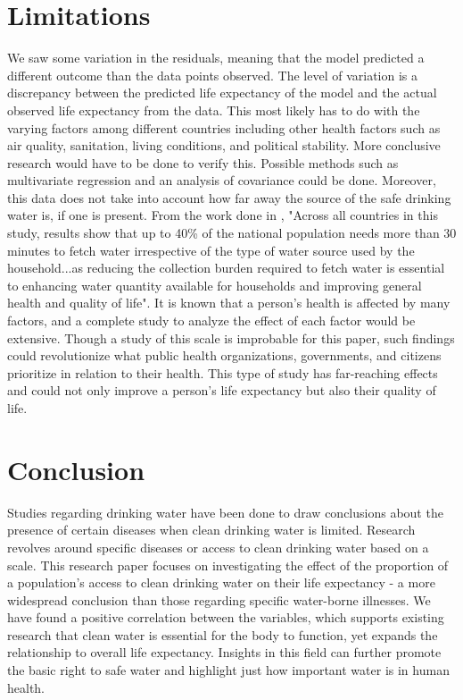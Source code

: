 \documentclass[12pt]{article}
\begin{document}
\section{Limitations}

We saw some variation in the residuals, meaning that the model predicted a different outcome than the data points observed. The level of variation is a discrepancy between the predicted life expectancy of the model and the actual observed life expectancy from the data. This most likely has to do with the varying factors among different countries including other health factors such as air quality, sanitation, living conditions, and political stability. More conclusive research would have to be done to verify this. Possible methods such as multivariate regression and an analysis of covariance could be done. Moreover, this data does not take into account how far away the source of the safe drinking water is, if one is present. From the work done in \citet{2018waterandhealth}, "Across all countries in this study, results show that up to 40\% of the national population needs more than 30 minutes to fetch water irrespective of the type of water source used by the household...as reducing the collection burden required to fetch water is essential to enhancing water quantity available for households and improving general health and quality of life". It is known that a person's health is affected by many factors, and a complete study to analyze the effect of each factor would be extensive. Though a study of this scale is improbable for this paper, such findings could revolutionize what public health organizations, governments, and citizens prioritize in relation to their health. This type of study has far-reaching effects and could not only improve a person's life expectancy but also their quality of life.

\section{Conclusion}

Studies regarding drinking water have been done to draw conclusions about the presence of certain diseases when clean drinking water is limited. Research revolves around specific diseases or access to clean drinking water based on a scale. This research paper focuses on investigating the effect of the proportion of a population's access to clean drinking water on their life expectancy - a more widespread conclusion than those regarding specific water-borne illnesses. We have found a positive correlation between the variables, which supports existing research that clean water is essential for the body to function, yet expands the relationship to overall life expectancy. Insights in this field can further promote the basic right to safe water and highlight just how important water is in human health.

\newpage



\end{document}
